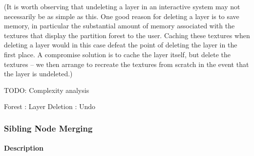 (It is worth observing that undeleting a layer in an interactive system may not necessarily be as simple as this. One good reason for deleting a layer is to save memory, in particular the substantial amount of memory associated with the textures that display the partition forest to the user. Caching these textures when deleting a layer would in this case defeat the point of deleting the layer in the first place. A compromise solution is to cache the layer itself, but delete the textures -- we then arrange to recreate the textures from scratch in the event that the layer is undeleted.)

TODO: Complexity analysis


\begin{stulisting}[p]
\caption{Forest : Layer Deletion : Undo}
\label{code:ipfs-forest-undeletelayerimpl}

\end{stulisting}

\afterpage{\clearpage}
\newpage

\subsubsection{Sibling Node Merging}

\paragraph{Description}

